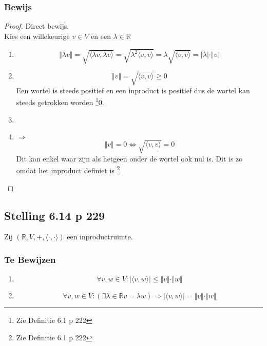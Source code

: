 \documentclass[lineaire_algebra_oplossingen.tex]{subfiles}
\begin{document}
\subsubsection*{Bewijs}
\begin{proof}
Direct bewijs.\\
Kies een willekeurige $v \in V$ en een $\lambda \in \mathbb{R}$
\begin{enumerate}
\item
\[
\Vert\lambda v\Vert = \sqrt{\langle \lambda v,\lambda v\rangle} = 
\sqrt{\lambda^2 \langle v,v\rangle}= \lambda\sqrt{\langle v,v\rangle} = \vert\lambda\vert\cdot \Vert v\Vert
\]

\item
\[
\Vert v\Vert= \sqrt{\langle v,v\rangle} \ge 0
\]
Een wortel is steeds positief en een inproduct is positief dus de wortel kan steeds getrokken worden \footnote{Zie Definitie 6.1 p 222}0.

\item
\item $\Rightarrow$\\
\[
\Vert v\Vert = 0 \Leftrightarrow \sqrt{\langle v,v\rangle}=0
\]
Dit kan enkel waar zijn als hetgeen onder de wortel ook nul is. Dit is zo omdat het inproduct definiet is \footnote{Zie Definitie 6.1 p 222}. 
\end{enumerate}
\end{proof}


\subsection{Stelling 6.14 p 229}
\label{6.14}
Zij $(\mathbb{R},V,+,\langle\cdot,\cdot\rangle)$ een inproductruimte.

\subsubsection*{Te Bewijzen}
\begin{enumerate}
\item 
\[
\forall v,w \in V: \vert\langle v,w\rangle\vert \le \Vert v\Vert\cdot \Vert w\Vert
\]
\item
\[
\forall v,w \in V: (\exists \lambda\in\mathbb{R} v = \lambda w) \Rightarrow \vert\langle v,w\rangle\vert = \Vert v\Vert\cdot \Vert w\Vert
\]
\end{enumerate}
\end{document}

